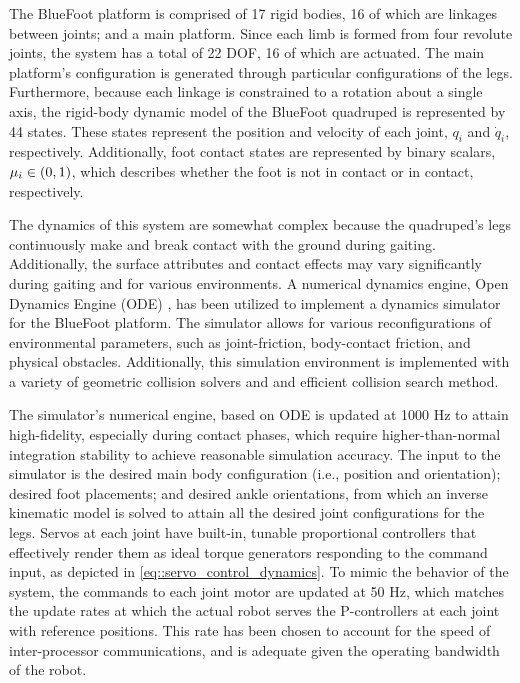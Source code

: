 		The BlueFoot platform is comprised of 17 rigid bodies, 16 of which are linkages between joints; and a main platform. Since each limb is formed from four revolute joints, the system has a total of 22 DOF, 16 of which are actuated. The main platform's configuration is generated through particular configurations of the legs. Furthermore, because each linkage is constrained to a rotation about a single axis, the rigid-body dynamic model of the BlueFoot quadruped is represented by 44 states. These states represent the position and velocity of each joint, $q_{i}$ and $\dot{q}_{i}$, respectively. Additionally, foot contact states are represented by binary scalars, $\mu_{i} \in \left(0,1\right)$, which describes whether the foot is not in contact or in contact, respectively.

		The dynamics of this system are somewhat complex because the quadruped's legs continuously make and break contact with the ground during gaiting. Additionally, the surface attributes and contact effects may vary significantly during gaiting and for various environments. A numerical dynamics engine, Open Dynamics Engine (ODE) \cite{ODE_Website}, has been utilized to implement a dynamics simulator for the BlueFoot platform. The simulator allows for various reconfigurations of environmental parameters, such as joint-friction, body-contact friction, and physical obstacles. Additionally, this simulation environment is implemented with a variety of geometric collision solvers and and efficient collision search method.

		The simulator's numerical engine, based on ODE is updated at 1000 Hz to attain high-fidelity, especially during contact phases, which require higher-than-normal integration stability to achieve reasonable  simulation accuracy. The input to the simulator is the desired main body configuration (i.e., position and orientation); desired foot placements; and desired ankle orientations, from which an inverse kinematic model is solved to attain all the desired joint configurations for the legs. Servos at each joint have built-in, tunable proportional controllers that effectively render them as ideal torque generators responding to the command input, as depicted in \ref{eq::servo_control_dynamics}. To mimic the behavior of the system, the commands to each joint motor are updated at 50 Hz, which matches the update rates at which the actual robot serves the P-controllers at each joint with reference positions. This rate has been chosen to account for the speed of inter-processor communications, and is adequate given the operating bandwidth of the robot.
		
